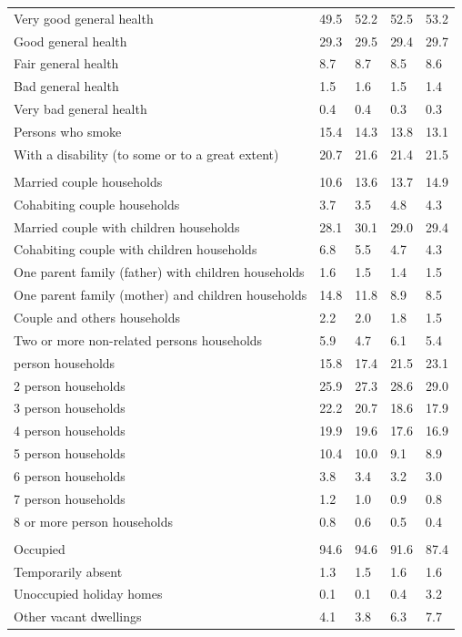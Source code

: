 \documentclass{article}
\begin{document}
\begin{table}[h]
\begin{tabular}{KTTTT}
    \hline
Very good general health & 49.5& 52.2&52.5& 53.2\\
Good general health & 29.3& 29.5& 29.4& 29.7\\
Fair general health & 8.7& 8.7&8.5& 8.6\\
Bad general health & 1.5& 1.6&1.5& 1.4\\
Very bad general health & 0.4& 0.4&0.3& 0.3\\
    \hline
Persons who smoke & 15.4& 14.3&13.8& 13.1\\
    \hline
With a disability (to some or to a great extent) & 20.7& 21.6&21.4& 21.5\\
\hline
    \\ 
    \hline
Married couple households & 10.6& 13.6& 13.7& 14.9\\
Cohabiting couple households & 3.7& 3.5& 4.8& 4.3\\
Married couple with children households & 28.1& 30.1& 29.0& 29.4\\
Cohabiting couple with children households & 6.8& 5.5& 4.7& 4.3\\
One parent family (father) with  children households & 1.6& 1.5& 1.4& 1.5\\
One parent family (mother) and children households & 14.8& 11.8&  8.9&  8.5\\
Couple and others households  & 2.2& 2.0& 1.8& 1.5\\
Two or more non-related persons households & 5.9& 4.7& 6.1& 5.4\\
     person households & 15.8& 17.4& 21.5& 23.1\\
2 person households & 25.9& 27.3& 28.6& 29.0\\
3 person households & 22.2& 20.7& 18.6& 17.9\\
4 person households & 19.9& 19.6& 17.6& 16.9\\
5 person households & 10.4& 10.0&  9.1&  8.9\\
6 person households & 3.8& 3.4& 3.2& 3.0\\
7 person households & 1.2& 1.0& 0.9& 0.8\\
8 or more person households & 0.8& 0.6& 0.5& 0.4\\
\hline
    \\ 
    \hline
Occupied & 94.6& 94.6& 91.6& 87.4\\
Temporarily absent & 1.3& 1.5& 1.6& 1.6\\
Unoccupied holiday homes & 0.1& 0.1& 0.4& 3.2\\
Other vacant dwellings & 4.1& 3.8& 6.3& 7.7\\
\hline
\end{tabular}
\end{table}
\end{document}

